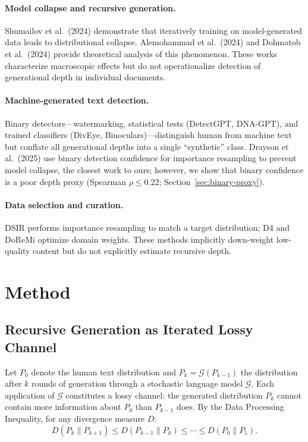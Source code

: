 \documentclass[11pt,a4paper]{article}
\begin{document}
\paragraph{Model collapse and recursive generation.}
Shumailov et al.\ (2024) demonstrate that iteratively training on model-generated data leads to distributional collapse.
Alemohammad et al.\ (2024) and Dohmatob et al.\ (2024) provide theoretical analysis of this phenomenon.
These works characterize macroscopic effects but do not operationalize detection of generational depth in individual documents.

\paragraph{Machine-generated text detection.}
Binary detectors---watermarking, statistical tests (DetectGPT, DNA-GPT), and trained classifiers (DivEye, Binoculars)---distinguish human from machine text but conflate all generational depths into a single ``synthetic'' class.
Drayson et al.\ (2025) use binary detection confidence for importance resampling to prevent model collapse, the closest work to ours; however, we show that binary confidence is a poor depth proxy (Spearman $\rho \leq 0.22$; Section~\ref{sec:binary-proxy}).

\paragraph{Data selection and curation.}
DSIR performs importance resampling to match a target distribution; D4 and DoReMi optimize domain weights.
These methods implicitly down-weight low-quality content but do not explicitly estimate recursive depth.

\section{Method}
\label{sec:method}

\subsection{Recursive Generation as Iterated Lossy Channel}
\label{sec:theory}

Let $P_0$ denote the human text distribution and $P_k = \mathcal{G}(P_{k-1})$ the distribution after $k$ rounds of generation through a stochastic language model $\mathcal{G}$.
Each application of $\mathcal{G}$ constitutes a lossy channel: the generated distribution $P_k$ cannot contain more information about $P_0$ than $P_{k-1}$ does.
By the Data Processing Inequality, for any divergence measure $D$:
\begin{equation}
    D(P_k \| P_{k+1}) \leq D(P_{k-1} \| P_k) \leq \cdots \leq D(P_0 \| P_1).
    \label{eq:dpi}
\end{equation}
\end{document}

